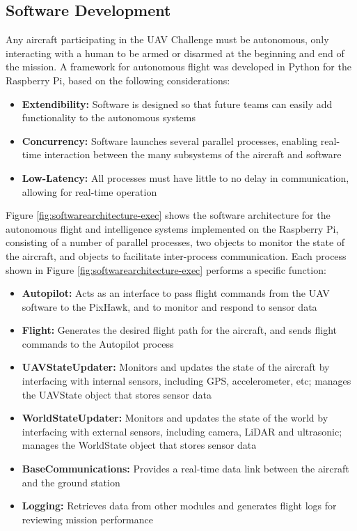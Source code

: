\subsection{Software Development}
Any aircraft participating in the UAV Challenge must be autonomous, only interacting with a human to be armed or disarmed at the beginning and end of the mission. A framework for autonomous flight was developed in Python for the Raspberry Pi, based on the following considerations:
\begin{itemize}
	\item \textbf{Extendibility:} Software is designed so that future teams can easily add functionality to the autonomous systems
	\item \textbf{Concurrency:} Software launches several parallel processes, enabling real-time interaction between the many subsystems of the aircraft and software
	\item \textbf{Low-Latency:} All processes must have little to no delay in communication, allowing for real-time operation 
\end{itemize}

Figure \ref{fig:softwarearchitecture-exec} shows the software architecture for the autonomous flight and intelligence systems implemented on the Raspberry Pi, consisting of a number of parallel processes, two objects to monitor the state of the aircraft, and objects to facilitate inter-process communication. Each process shown in Figure \ref{fig:softwarearchitecture-exec} performs a specific function:
\begin{itemize}
	\item \textbf{Autopilot:} Acts as an interface to pass flight commands from the UAV software to the PixHawk, and to monitor and respond to sensor data
	\item \textbf{Flight:} Generates the desired flight path for the aircraft, and sends flight commands to the Autopilot process
	\item \textbf{UAVStateUpdater:} Monitors and updates the state of the aircraft by interfacing with internal sensors, including GPS, accelerometer, etc; manages the UAVState object that stores sensor data
	\item \textbf{WorldStateUpdater:} Monitors and updates the state of the world by interfacing with external sensors, including camera, LiDAR and ultrasonic; manages the WorldState object that stores sensor data
	\item \textbf{BaseCommunications:} Provides a real-time data link between the aircraft and the ground station
	\item \textbf{Logging:} Retrieves data from other modules and generates flight logs for reviewing mission performance
\end{itemize}

